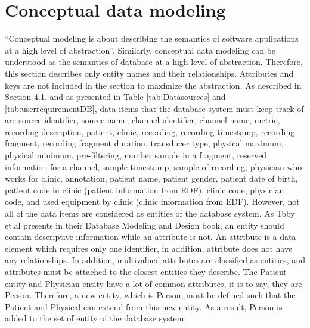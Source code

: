 \section{Conceptual data modeling}
“Conceptual modeling is about describing the semantics of software applications at a high level of abstraction”\cite{CONCEPTUAL_BOOK}. Similarly, conceptual data modeling can be understood as the semantics of database at a high level of abstraction. Therefore, this section describes only entity names and their relationships. Attributes and keys are not included in the section to maximize the abstraction. As described in Section 4.1, and as presented in Table \ref{tab:Datasources} and \ref{tab:userrequirementDB}, data items that the database system must keep track of are source identifier, source name, channel identifier, channel name, metric, recording description, patient, clinic, recording, recording timestamp, recording fragment, recording fragment duration, transducer type, physical maximum, physical minimum, pre-filtering, number sample in a fragment, reserved information for a channel, sample timestamp, sample of recording, physician who works for clinic, annotation, patient name, patient gender, patient date of birth, patient code in clinic (patient information from EDF), clinic code, physician code, and used equipment by clinic (clinic information from EDF). However, not all of the data items are considered as entities of the database system. As Toby et.al\cite{DATABASEMODELING_BOOK} presents in their Database Modeling and Design book, an entity should contain descriptive information while an attribute is not. An attribute is a data element which requires only one identifier, in addition, attribute does not have any relationships. In addition, multivalued attributes are classified as entities, and attributes must be attached to the closest entities they describe. The Patient entity and Physician entity have a lot of common attributes, it is to say, they are Person. Therefore, a new entity, which is Person, must be defined such that the Patient and Physical can extend from this new entity. As a result, Person is added to the set of entity of the database system.\\
